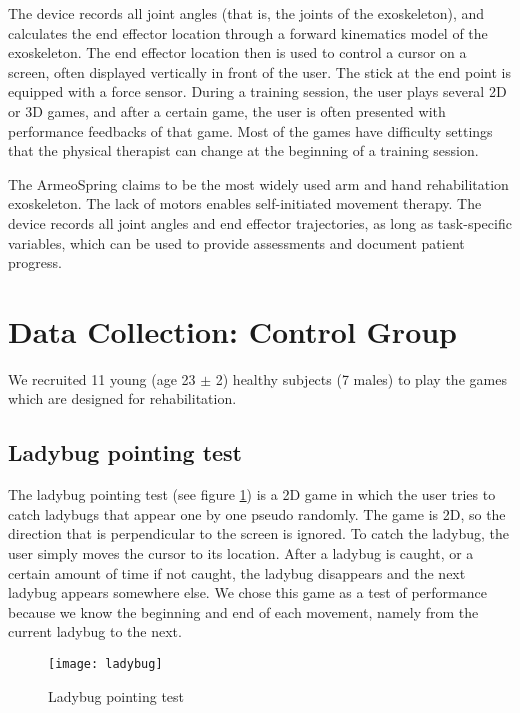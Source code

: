 The device records all joint angles (that is, the joints of the exoskeleton), and calculates the end effector location through a forward kinematics model of the exoskeleton. The end effector location then is used to control a cursor on a screen, often displayed vertically in front of the user. The stick at the end point is equipped with a force sensor. During a training session, the user plays several 2D or 3D games, and after a certain game, the user is often presented with performance feedbacks of that game. Most of the games have difficulty settings that the physical therapist can change at the beginning of a training session.

The ArmeoSpring claims to be the most widely used arm and hand rehabilitation exoskeleton. The lack of motors enables self-initiated movement therapy. The device records all joint angles and end effector trajectories, as long as task-specific variables, which can be used to provide assessments and document patient progress.

\section{Data Collection: Control Group}
\label{datacontrol}

We recruited 11 young (age 23 $\pm$ 2) healthy subjects (7 males) to play the games which are designed for rehabilitation.

\subsection{Ladybug pointing test}

The ladybug pointing test (see figure \ref{fig:ladybug}) is a 2D game in which the user tries to catch ladybugs that appear one by one pseudo randomly. The game is 2D, so the direction that is perpendicular to the screen is ignored. To catch the ladybug, the user simply moves the cursor to its location. After a ladybug is caught, or a certain amount of time if not caught, the ladybug disappears and the next ladybug appears somewhere else. We chose this game as a test of performance because we know the beginning and end of each movement, namely from the current ladybug to the next.

\begin{figure}
	\texttt{[image: ladybug]}
	\centering
	\caption{Ladybug pointing test}
	\label{fig:ladybug}
\end{figure}

